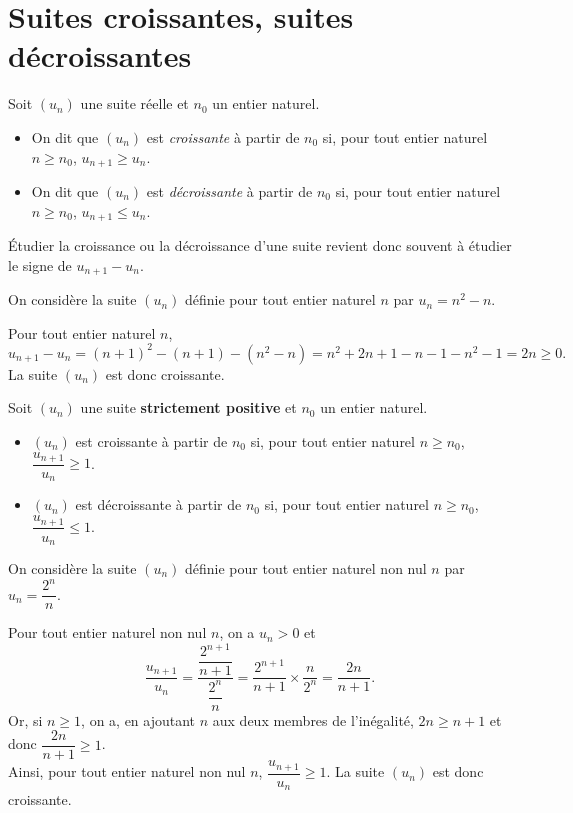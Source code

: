 \documentclass[11pt,fleqn]{book} %
\begin{document}
\section{Suites croissantes, suites décroissantes}

\begin{definition}Soit $(u_n)$ une suite réelle et $n_0$ un entier naturel.

\begin{itemize}
\item On dit que $(u_n)$ est \textit{croissante} à partir de $n_0$ si, pour tout entier naturel $n\geqslant n_0$, $u_{n+1} \geqslant u_n$.
\item On dit que $(u_n)$ est \textit{décroissante} à partir de $n_0$ si, pour tout entier naturel $n\geqslant n_0$, $u_{n+1} \leqslant u_n$.
\end{itemize}\end{definition}

Étudier la croissance ou la décroissance d'une suite revient donc souvent à étudier le signe de $u_{n+1}-u_n$.

\begin{example}On considère la suite $(u_n)$ définie pour tout entier naturel $n$ par $u_n=n^2-n$. 

Pour tout entier naturel $n$,
\[u_{n+1}-u_n = (n+1)^2-(n+1)-(n^2-n)=n^2+2n+1-n-1-n^2-1=2n \geqslant 0.\]
La suite $(u_n)$ est donc croissante.\end{example}
\newpage
\begin{proposition}Soit $(u_n)$ une suite \textbf{strictement positive} et $n_0$ un entier naturel. 
\begin{itemize}
\item $(u_n)$ est croissante à partir de $n_0$ si, pour tout entier naturel $n\geqslant n_0$, $\dfrac{u_{n+1}}{u_n} \geqslant 1$.
\vskip5pt
\item $(u_n)$ est décroissante à partir de $n_0$ si, pour tout entier naturel $n\geqslant n_0$, $\dfrac{u_{n+1}}{u_n} \leqslant 1$.
\end{itemize}
\end{proposition}

\begin{example}On considère la suite $(u_n)$ définie pour tout entier naturel non nul $n$ par $u_n=\dfrac{2^n}{n}$. 

Pour tout entier naturel non nul $n$, on a $u_n>0$ et 
\[\dfrac{u_{n+1}}{u_n}=\dfrac{\dfrac{2^{n+1}}{n+1}}{\dfrac{2^n}{n}}=\dfrac{2^{n+1}}{n+1}\times \dfrac{n}{2^n} = \dfrac{2n}{n+1}.\]
Or, si $n\geqslant 1$, on a, en ajoutant $n$ aux deux membres de l'inégalité, $2n \geqslant n+1$ et donc $\dfrac{2n}{n+1}\geqslant 1$. \\ Ainsi, pour tout entier naturel non nul $n$, $\dfrac{u_{n+1}}{u_n}\geqslant 1$. La suite $(u_n)$ est donc croissante.\end{example}
\end{document}
